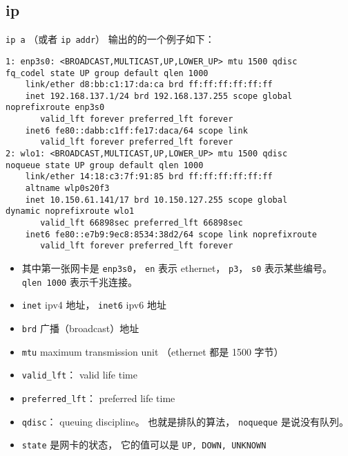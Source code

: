 \subsection{ip}
\verb|ip a| （或者 \verb|ip addr|） 输出的的一个例子如下：
\begin{lstlisting}[language=none]
1: enp3s0: <BROADCAST,MULTICAST,UP,LOWER_UP> mtu 1500 qdisc
fq_codel state UP group default qlen 1000
    link/ether d8:bb:c1:17:da:ca brd ff:ff:ff:ff:ff:ff
    inet 192.168.137.1/24 brd 192.168.137.255 scope global 
noprefixroute enp3s0
       valid_lft forever preferred_lft forever
    inet6 fe80::dabb:c1ff:fe17:daca/64 scope link 
       valid_lft forever preferred_lft forever
2: wlo1: <BROADCAST,MULTICAST,UP,LOWER_UP> mtu 1500 qdisc
noqueue state UP group default qlen 1000
    link/ether 14:18:c3:7f:91:85 brd ff:ff:ff:ff:ff:ff
    altname wlp0s20f3
    inet 10.150.61.141/17 brd 10.150.127.255 scope global 
dynamic noprefixroute wlo1
       valid_lft 66898sec preferred_lft 66898sec
    inet6 fe80::e7b9:9ec8:8534:38d2/64 scope link noprefixroute 
       valid_lft forever preferred_lft forever
\end{lstlisting}
\begin{itemize}
\item 其中第一张网卡是 \verb|enp3s0|， \verb|en| 表示 ethernet， \verb|p3|， \verb|s0| 表示某些编号。 \verb|qlen 1000| 表示千兆连接。
\item \verb|inet| ipv4 地址， \verb|inet6| ipv6 地址
\item \verb|brd| 广播（broadcast）地址
\item \verb|mtu| maximum transmission unit （ethernet 都是 1500 字节）
\item \verb|valid_lft|： valid life time
\item \verb|preferred_lft|： preferred life time
\item \verb|qdisc|： queuing discipline。 也就是排队的算法， \verb|noqueque| 是说没有队列。
\item \verb|state| 是网卡的状态， 它的值可以是 \verb|UP, DOWN, UNKNOWN|
\end{itemize}


